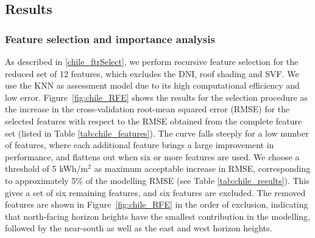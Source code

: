 \subsection{Results}

\subsubsection{Feature selection and importance analysis}

As described in \ref{chile_ftrSelect}, we perform recursive feature selection for the reduced set of 12 features, which excludes the DNI, roof shading and SVF. We use the KNN as assessment model due to its high computational efficiency and low error. Figure~\ref{fig:chile_RFE} shows the results for the selection procedure as the increase in the cross-validation root-mean squared error (RMSE) for the selected features with respect to the RMSE obtained from the complete feature set (listed in Table \ref{tab:chile_features}). The curve falls steeply for a low number of features, where each additional feature brings a large improvement in performance, and flattens out when six or more features are used. We choose a threshold of 5 kWh/m$^2$ as maximum acceptable increase in RMSE, corresponding to approximately 5\% of the modelling RMSE (see Table \ref{tab:chile_results}). This gives a set of six remaining features, and six features are excluded. The removed features are shown in Figure~\ref{fig:chile_RFE} in the order of exclusion, indicating that north-facing horizon heights have the smallest contribution in the modelling, followed by the near-south as well as the east and west horizon heights.

